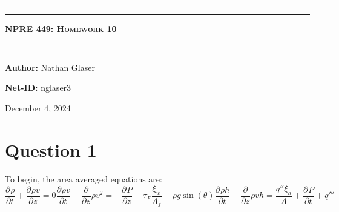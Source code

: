 \documentclass{article}
\begin{document}
\newcommand{\circled}[1]{\tikz[baseline=(char.base)]{
            \node[shape=circle,draw,inner sep=2pt] (char) {#1};}}

\newcommand{\pd}[3]{\frac{\partial^{#3}#1}{\partial {#2}^{#3}}}
\begin{titlepage}

\centering
\scshape
\vspace{\baselineskip}

%
\rule{\textwidth}{1.6pt}\vspace*{-\baselineskip}\vspace*{2pt}
\rule{\textwidth}{0.4pt}

{\Huge \textbf{\textsc{NPRE 449: Homework 10 \\
\vspace{15pt}}}}

\rule{\textwidth}{0.4pt}\vspace*{-\baselineskip}\vspace{3.2pt}
\rule{\textwidth}{1.6pt}\vspace{6pt}
\vspace{1.5\baselineskip}


\large \centerline{\textbf{Author:} Nathan Glaser}
\large \centerline{\textbf{Net-ID:} nglaser3}
\quad

\vfill
\large \centerline{December 4, 2024}
%
\end{titlepage}

\tableofcontents
\newpage
{}

\section{Question 1}
To begin, the area averaged equations are:
\begin{subequations}
    \begin{equation}
        \pd{\rho}{t}{} + \pd{\rho v}{z}{} = 0
        \label{mass}
    \end{equation}
    \begin{equation}
        \pd{\rho v}{t}{} + \pd{}{z}{}\rho v^2 = -\pd{P}{z}{}-\tau_F\frac{\xi_w}{A_f} - \rho g \sin(\theta)
        \label{momentum}
    \end{equation}
    \begin{equation}
        \pd{\rho h}{t}{} + \pd{}{z}{}\rho v h = \frac{q''\xi_h}{A}+\pd{P}{t}{} + q'''
        \label{energy}
    \end{equation}
\end{subequations}
\end{document}
